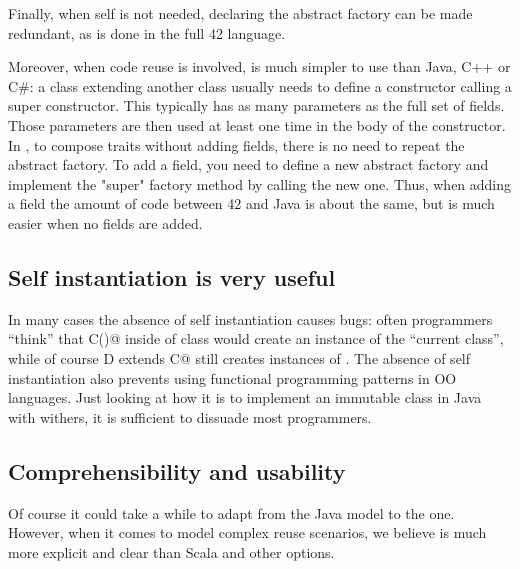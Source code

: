 Finally, when self  is not needed, declaring the abstract factory can be made redundant, as is done in the full 42 language.

Moreover, when code reuse is involved, \name is much simpler to use than Java, C++ or C\#: a class extending another class usually needs to define a constructor calling a super constructor.
   This typically has as many parameters as the full set of fields. Those parameters are then used at least one time in the body of the constructor.
In \name, to compose traits without adding fields, there is no need to repeat the abstract factory.
To add a field, you need to define a new abstract factory and implement the "super" factory method by calling the new one.
Thus, when adding a field the amount of code between 42 and Java is about the same, but is much easier when no fields are added.


\subsection{Self instantiation is very useful}
In many cases the absence of self instantiation causes bugs: often programmers ``think'' that \Q@new C()@ inside of class \Q@C@ would create an instance of the ``current class'', while of course \Q@class D extends C@ still creates instances of \Q@C@.
The absence of self instantiation also prevents using functional programming patterns in OO languages.
Just looking at how  it is to implement an immutable \Q@Point@ class in Java with withers, it is sufficient to dissuade most programmers.

\subsection{Comprehensibility and usability}
Of course it could take a while to adapt from the Java model to the \name one. However, when it comes to model complex reuse scenarios, we believe \name is much more explicit and clear than Scala and other options. 

